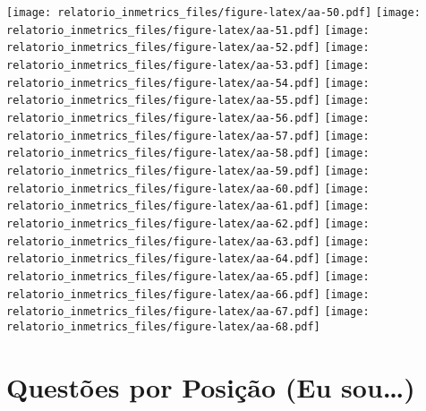 \documentclass[]{book}
\begin{document}
\texttt{[image: relatorio\_inmetrics\_files/figure-latex/aa-50.pdf]} \texttt{[image: relatorio\_inmetrics\_files/figure-latex/aa-51.pdf]} \texttt{[image: relatorio\_inmetrics\_files/figure-latex/aa-52.pdf]} \texttt{[image: relatorio\_inmetrics\_files/figure-latex/aa-53.pdf]} \texttt{[image: relatorio\_inmetrics\_files/figure-latex/aa-54.pdf]} \texttt{[image: relatorio\_inmetrics\_files/figure-latex/aa-55.pdf]} \texttt{[image: relatorio\_inmetrics\_files/figure-latex/aa-56.pdf]} \texttt{[image: relatorio\_inmetrics\_files/figure-latex/aa-57.pdf]} \texttt{[image: relatorio\_inmetrics\_files/figure-latex/aa-58.pdf]} \texttt{[image: relatorio\_inmetrics\_files/figure-latex/aa-59.pdf]} \texttt{[image: relatorio\_inmetrics\_files/figure-latex/aa-60.pdf]} \texttt{[image: relatorio\_inmetrics\_files/figure-latex/aa-61.pdf]} \texttt{[image: relatorio\_inmetrics\_files/figure-latex/aa-62.pdf]} \texttt{[image: relatorio\_inmetrics\_files/figure-latex/aa-63.pdf]} \texttt{[image: relatorio\_inmetrics\_files/figure-latex/aa-64.pdf]} \texttt{[image: relatorio\_inmetrics\_files/figure-latex/aa-65.pdf]} \texttt{[image: relatorio\_inmetrics\_files/figure-latex/aa-66.pdf]} \texttt{[image: relatorio\_inmetrics\_files/figure-latex/aa-67.pdf]} \texttt{[image: relatorio\_inmetrics\_files/figure-latex/aa-68.pdf]}

\hypertarget{questoes-por-posicao-eu-sou}{%
\section{Questões por Posição (Eu sou\ldots{})}\label{questoes-por-posicao-eu-sou}}
\end{document}
